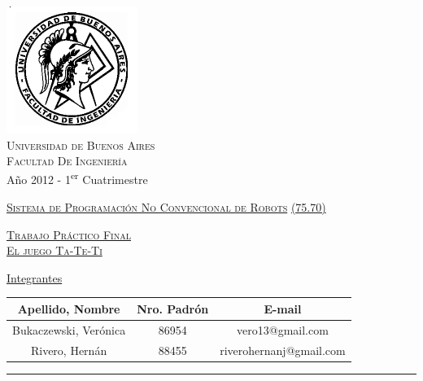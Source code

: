 \documentclass[12pt,titlepage]{article}
\begin{document}
\begin{titlepage}

\thispagestyle{empty}

\begin{center}
\includegraphics[scale=0.55]{./imgs/fiuba-logo.png}\\
\large{\textsc{Universidad de Buenos Aires}}\\
\large{\textsc{Facultad De Ingeniería}}\\
\small{Año 2012 - 1\textsuperscript{er} Cuatrimestre}
\end{center}

\vfill

\begin{center}

\Large{\underline{\textsc{Sistema de Programaci\'on No Convencional de Robots}}}
\Large{\underline{\textsc{(75.70)}}}

\vfill


\Large{\underline{\textsc{Trabajo Pr\'actico Final}}} \\
\Large{\underline{\textsc{El juego Ta-Te-Ti}}}
\vfill
 
\Large\underline{Integrantes} \linebreak\linebreak

\large\addtolength{\tabcolsep}{-3pt}
\begin{tabular}{|| c | c | c ||}
\hline
\textbf{Apellido, Nombre} & \textbf{Nro. Padrón} & \textbf{E-mail} \\
\hline
Bukaczewski, Verónica & 86954 & vero13@gmail.com \\
\hline
Rivero, Hern\'an & 88455 & riverohernanj@gmail.com \\
\hline
\end{tabular}
\end{center}

\vfill

\hrule
\vspace{0.2cm}


\end{titlepage}
\end{document}
